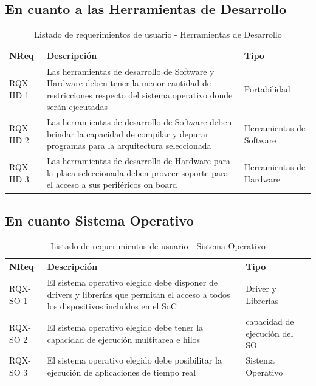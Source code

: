 		\newpage
			
		\subsection{En cuanto a las Herramientas de Desarrollo}
		\begin{table}[h]
		\centering
		\begin{tabular}{ p{2.5cm} p{8cm} p{3cm} }
		\hline 
		\rowcolor[gray]{0.8} N\textordmasculine Req & Descripción  & Tipo\\
		\hline 
		RQX-HD 1 &  Las herramientas de desarrollo de Software y Hardware deben tener la menor cantidad de restricciones respecto del sistema operativo donde serán ejecutadas & Portabilidad\\
		\hline 
		RQX-HD 2 &  Las herramientas de desarrollo de Software deben brindar la capacidad de compilar y depurar programas para la arquitectura seleccionada &
		Herramientas de Software\\
		\hline
		RQX-HD 3 &  Las herramientas de desarrollo de Hardware para la placa seleccionada deben proveer soporte para el acceso a sus periféricos on board &
		Herramientas de Hardware\\ 
		\hline 
		\end{tabular}
		\caption{Listado de requerimientos de usuario - Herramientas de Desarrollo}
		\label{tab:requsr3}
		\end{table}
		
		\subsection{En cuanto Sistema Operativo} 	 
		\begin{table}[h]
		\centering
		\begin{tabular}{ p{2.5cm} p{8cm} p{3cm} }
		\hline 
		\rowcolor[gray]{0.8} N\textordmasculine Req & Descripción  & Tipo\\
		\hline 
		RQX-SO 1 &  El sistema operativo elegido debe disponer de drivers y librerías que permitan el acceso a todos los dispositivos incluídos en el SoC &
		Driver y Librerías\\
		\hline 
		RQX-SO 2 &  El sistema operativo elegido debe tener la capacidad de ejecución multitarea e hilos & capacidad de ejecución del SO\\ 
		\hline
		RQX-SO 3 &  El sistema operativo elegido debe posibilitar la ejecución de aplicaciones de tiempo real & Sistema Operativo\\ 
		\hline 
		\end{tabular}
		\caption{Listado de requerimientos de usuario - Sistema Operativo}
		\label{tab:requsr4}
		\end{table}
	
